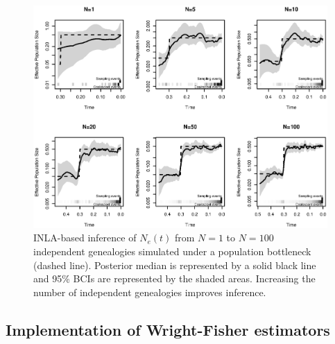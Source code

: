 \documentclass[english,titlepage]{article}
\begin{document}
\begin{figure}
\begin{center}
      \includegraphics[scale=0.8]{Figures/Bottle_20_independent.eps}    \end{center}
      \caption{\small{INLA-based inference of $N_{e}(t)$ from $N=1$ to $N=100$ independent genealogies simulated under a population bottleneck (dashed line). Posterior median is represented by a solid black line and 95\% BCIs are represented by the shaded areas. Increasing the number of independent genealogies improves inference.}}

\end{figure}
 





\subsection*{Implementation of Wright-Fisher estimators}
\end{document}
